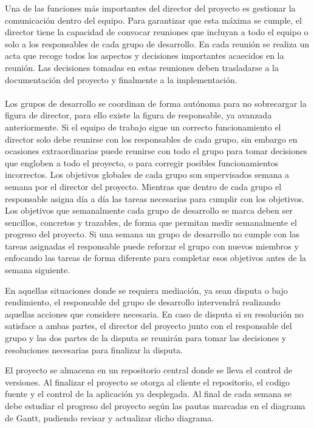 Una de las funciones más importantes del director del proyecto es gestionar la comunicación dentro del equipo. Para garantizar que esta máxima se cumple, el director tiene la capacidad de convocar reuniones que incluyan a todo el equipo o solo a los responsables de cada grupo de desarrollo. En cada reunión se realiza un acta que recoge todos los aspectos y decisiones importantes acaecidos en la reunión. Las decisiones tomadas en estas reuniones deben trasladarse a la documentación del proyecto y finalmente a la implementación.
\\\\
Los grupos de desarrollo se coordinan de forma autónoma para no sobrecargar la figura de director, para ello existe la figura de responsable, ya avanzada anteriormente. Si el equipo de trabajo sigue un correcto funcionamiento el director solo debe reunirse con los responsables de cada grupo, sin embargo en ocasiones extraordinarias puede reunirse con todo el grupo para tomar decisiones que engloben a todo el proyecto, o para corregir posibles funcionamientos incorrectos. Los objetivos globales de cada grupo son supervisados semana a semana por el director del proyecto. Mientras que dentro de cada grupo el responsable asigna día a día las tareas necesarias para cumplir con los objetivos. Los objetivos que semanalmente cada grupo de desarrollo se marca deben ser sencillos, concretos y trazables, de forma que permitan  medir semanalmente el progreso del proyecto. Si una semana un grupo de desarrollo no cumple con las tareas asignadas el responsable puede reforzar el grupo con nuevos miembros y enfocando las tareas de forma diferente para completar esos objetivos antes de la semana siguiente.

En aquellas situaciones donde se requiera mediación, ya sean disputa o bajo rendimiento, el responsable del grupo de desarrollo intervendrá realizando aquellas acciones que considere necesaria. En caso de disputa si su resolución no satisface a ambas partes, el director del proyecto junto con el responsable del grupo y las dos partes de la disputa se reunirán para tomar las decisiones y resoluciones necesarias para finalizar la disputa.

El proyecto se almacena en un repositorio central donde se lleva el control de versiones. Al finalizar el proyecto se otorga al cliente el repositorio, el codigo fuente y el control de la aplicación ya desplegada. Al final de cada semana se debe estudiar el progreso del proyecto según las pautas marcadas en el diagrama de Gantt, pudiendo revisar y actualizar dicho diagrama.

